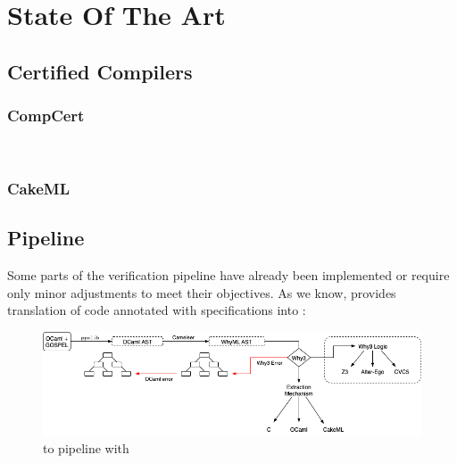 
%

\chapter{State Of The Art}
\label{cha:State_Of_The_Art}

\section{Certified Compilers}
\label{sec:Certified_Compilers}

\subsection{CompCert}
\label{sec:CompCert}

~\cite{MonniauxB22, Leroy09-back-end}

\subsection{CakeML}
\label{sec:CakeML}

\section{Pipeline}
\label{sec:Pipeline}

Some parts of the verification pipeline have already been implemented or require only minor adjustments to meet their 
objectives. As we know, \cameleer provides translation of \ocaml code annotated with \gospel specifications into \whyml :

\begin{figure}[H]
    \centering
    \includegraphics[width=\linewidth]{images/Cameleer.png}
    \caption{\ocaml to \whyml pipeline with \cameleer}
    \label{fig:Cameleer_pipeline}
\end{figure}

